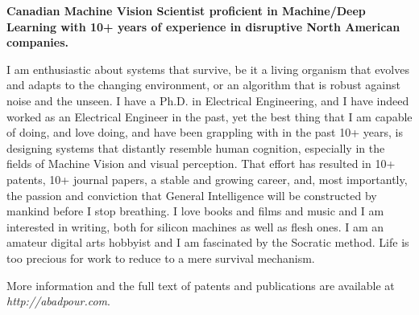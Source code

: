 \onehalfspace
\textbf{\large Canadian Machine Vision Scientist proficient in Machine/Deep Learning with 10+ years of experience in disruptive North American companies.}
\singlespace

\vspace{1cm}

I am enthusiastic about systems that survive, be it a living organism that evolves and adapts to the changing environment, or an algorithm that is robust against noise and the unseen. I have a Ph.D. in Electrical Engineering, and I have indeed worked as an Electrical Engineer in the past, yet the best thing that I am capable of doing, and love doing, and have been grappling with in the past 10+ years, is designing systems that distantly resemble human cognition, especially in the fields of Machine Vision and visual perception. That effort has resulted in 10+ patents, 10+ journal papers, a stable and growing career, and, most importantly, the passion and conviction that General Intelligence will be constructed by mankind before I stop breathing. I love books and films and music and I am interested in writing, both for silicon machines as well as flesh ones. I am an amateur digital arts hobbyist and I am fascinated by the Socratic method. Life is too precious for work to reduce to a mere survival mechanism.

\vspace{0.5cm}
More information and the full text of patents and publications are available at \emph{http://abadpour.com}.

\vspace{1.5cm}
